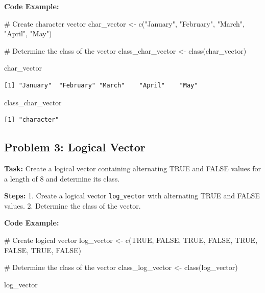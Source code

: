 \documentclass[
  letterpaper,
  DIV=11,
  numbers=noendperiod]{scrreprt}
\newenvironment{Shaded}{\begin{snugshade}}{\end{snugshade}}
\newcommand{\CommentTok}[1]{\textcolor[rgb]{0.37,0.37,0.37}{#1}}
\newcommand{\ConstantTok}[1]{\textcolor[rgb]{0.56,0.35,0.01}{#1}}
\newcommand{\FunctionTok}[1]{\textcolor[rgb]{0.28,0.35,0.67}{#1}}
\newcommand{\NormalTok}[1]{\textcolor[rgb]{0.00,0.23,0.31}{#1}}
\newcommand{\OtherTok}[1]{\textcolor[rgb]{0.00,0.23,0.31}{#1}}
\newcommand{\StringTok}[1]{\textcolor[rgb]{0.13,0.47,0.30}{#1}}
\begin{document}
\textbf{Code Example:}

\begin{Shaded}
\begin{Highlighting}[]
\CommentTok{\# Create character vector}
\NormalTok{char\_vector }\OtherTok{\textless{}{-}} \FunctionTok{c}\NormalTok{(}\StringTok{"January"}\NormalTok{, }\StringTok{"February"}\NormalTok{, }\StringTok{"March"}\NormalTok{, }\StringTok{"April"}\NormalTok{, }\StringTok{"May"}\NormalTok{)}

\CommentTok{\# Determine the class of the vector}
\NormalTok{class\_char\_vector }\OtherTok{\textless{}{-}} \FunctionTok{class}\NormalTok{(char\_vector)}

\NormalTok{char\_vector}
\end{Highlighting}
\end{Shaded}

\begin{verbatim}
[1] "January"  "February" "March"    "April"    "May"     
\end{verbatim}

\begin{Shaded}
\begin{Highlighting}[]
\NormalTok{class\_char\_vector}
\end{Highlighting}
\end{Shaded}

\begin{verbatim}
[1] "character"
\end{verbatim}

\subsection*{Problem 3: Logical Vector}\label{problem-3-logical-vector}

\textbf{Task:} Create a logical vector containing alternating TRUE and
FALSE values for a length of 8 and determine its class.

\textbf{Steps:} 1. Create a logical vector \texttt{log\_vector} with
alternating TRUE and FALSE values. 2. Determine the class of the vector.

\textbf{Code Example:}

\begin{Shaded}
\begin{Highlighting}[]
\CommentTok{\# Create logical vector}
\NormalTok{log\_vector }\OtherTok{\textless{}{-}} \FunctionTok{c}\NormalTok{(}\ConstantTok{TRUE}\NormalTok{, }\ConstantTok{FALSE}\NormalTok{, }\ConstantTok{TRUE}\NormalTok{, }\ConstantTok{FALSE}\NormalTok{, }\ConstantTok{TRUE}\NormalTok{, }\ConstantTok{FALSE}\NormalTok{, }\ConstantTok{TRUE}\NormalTok{, }\ConstantTok{FALSE}\NormalTok{)}

\CommentTok{\# Determine the class of the vector}
\NormalTok{class\_log\_vector }\OtherTok{\textless{}{-}} \FunctionTok{class}\NormalTok{(log\_vector)}

\NormalTok{log\_vector}
\end{Highlighting}
\end{Shaded}
\end{document}
